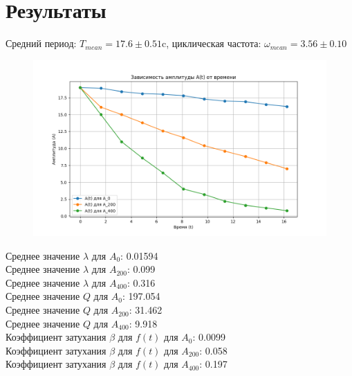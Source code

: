 \documentclass[a4paper]{article}
\begin{document}
\begin{figure}[H]
\begin{center}
\end{center}
\end{figure}





\section{Результаты}


Средний период: $T_{mean}=17.6 \pm 0.51$c, циклическая частота: $\omega_{mean}=3.56 \pm 0.10$
\begin{figure}[H]
\begin{center}
\includegraphics[scale=0.5]{gra_2.png}
\end{center}
\end{figure}
\centering
Среднее значение $\lambda$ для $A_0$: 0.01594\\
Среднее значение $\lambda$ для $A_{200}$: 0.099\\
Среднее значение $\lambda$ для $A_{400}$: 0.316\\
Среднее значение $Q$ для $A_0$: 197.054\\
Среднее значение $Q$ для $A_{200}$: 31.462\\
Среднее значение $Q$ для $A_{400}$: 9.918\\
Коэффициент затухания $\beta$ для $f(t)$ для $A_0$: 0.0099\\
Коэффициент затухания $\beta$ для $f(t)$ для $A_{200}$: 0.058\\
Коэффициент затухания $\beta$ для $f(t)$ для $A_{400}$: 0.197\\
\end{document}
